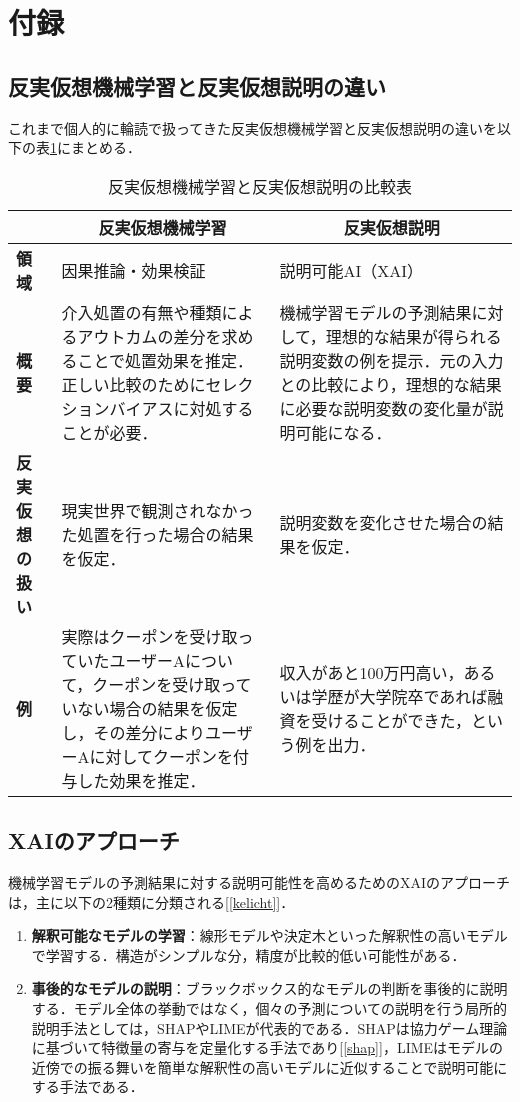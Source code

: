 \documentclass[dvipdfmx]{jreport}
\begin{document}

\section{付録}
\subsection{反実仮想機械学習と反実仮想説明の違い}
これまで個人的に輪読で扱ってきた反実仮想機械学習と反実仮想説明の違いを以下の表\ref{tab:compare_cf}にまとめる．
\begin{table}[h]
    \centering
    \caption{反実仮想機械学習と反実仮想説明の比較表}\label{tab:compare_cf}
    \begin{tabular}{|p{25mm}||p{55mm}|p{55mm}|} \hline
        \rowcolor{gray!20}
        & \multicolumn{1}{c|}{\textbf{反実仮想機械学習}} & \multicolumn{1}{c|}{\textbf{反実仮想説明}}  \\ \hline 
        \textbf{領域} & 因果推論・効果検証 & 説明可能AI（XAI） \\ \hline
        \textbf{概要} & 介入処置の有無や種類によるアウトカムの差分を求めることで処置効果を推定．正しい比較のためにセレクションバイアスに対処することが必要． & 機械学習モデルの予測結果に対して，理想的な結果が得られる説明変数の例を提示．元の入力との比較により，理想的な結果に必要な説明変数の変化量が説明可能になる．\\ \hline
        \textbf{反実仮想の扱い} & 現実世界で観測されなかった処置を行った場合の結果を仮定． & 説明変数を変化させた場合の結果を仮定． \\ \hline
        \textbf{例} & 実際はクーポンを受け取っていたユーザーAについて，クーポンを受け取っていない場合の結果を仮定し，その差分によりユーザーAに対してクーポンを付与した効果を推定． & 収入があと100万円高い，あるいは学歴が大学院卒であれば融資を受けることができた，という例を出力． \\ \hline
    \end{tabular}
\end{table}

\subsection{XAIのアプローチ}
機械学習モデルの予測結果に対する説明可能性を高めるためのXAIのアプローチは，主に以下の2種類に分類される[\ref{kelicht}]．
\begin{tcolorbox}[title=\textbf{XAIのアプローチ}]
    \begin{enumerate}
        \item \textbf{解釈可能なモデルの学習}：線形モデルや決定木といった解釈性の高いモデルで学習する．構造がシンプルな分，精度が比較的低い可能性がある．
        \item \textbf{事後的なモデルの説明}：ブラックボックス的なモデルの判断を事後的に説明する．モデル全体の挙動ではなく，個々の予測についての説明を行う局所的説明手法としては，SHAPやLIMEが代表的である．SHAPは協力ゲーム理論に基づいて特徴量の寄与を定量化する手法であり[\ref{shap}]，LIMEはモデルの近傍での振る舞いを簡単な解釈性の高いモデルに近似することで説明可能にする手法である．
    \end{enumerate}
\end{tcolorbox}
\end{document}
